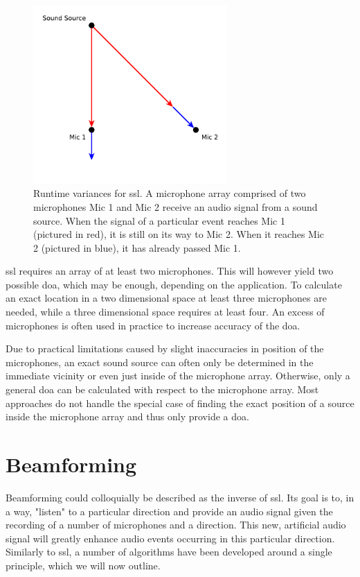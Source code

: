 \begin{figure}[]
	\centering
	\includegraphics[width=0.66\textwidth]{diagrams/basics_ssl.pdf}
	\caption{Runtime variances for \gls{ssl}.
		A microphone array comprised of two microphones Mic 1 and Mic 2 receive an audio signal from a sound source.
		When the signal of a particular event reaches Mic 1 (pictured in red), it is still on its way to Mic 2.
		When it reaches Mic 2 (pictured in blue), it has already passed Mic 1.}
	\label{pic:basics:ssl}
\end{figure}

\gls{ssl} requires an array of at least two microphones.
This will however yield two possible \gls{doa}, which may be enough, depending on the application.%
To calculate an exact location in a two dimensional space at least three microphones are needed, while a three dimensional space requires at least four.
An excess of microphones is often used in practice to increase accuracy of the \gls{doa}.

Due to practical limitations caused by slight inaccuracies in position of the microphones, an exact sound source can often only be determined in the immediate vicinity or even just inside of the microphone array.
Otherwise, only a general \gls{doa} can be calculated with respect to the microphone array.
Most approaches do not handle the special case of finding the exact position of a source inside the microphone array and thus only provide a \gls{doa}.

\section{Beamforming}
Beamforming could colloquially be described as the inverse of \gls{ssl}.
Its goal is to, in a way, "listen" to a particular direction and provide an audio signal given the recording of a number of microphones and a direction.
This new, artificial audio signal will greatly enhance audio events occurring in this particular direction.
Similarly to \gls{ssl}, a number of algorithms have been developed around a single principle, which we will now outline.

